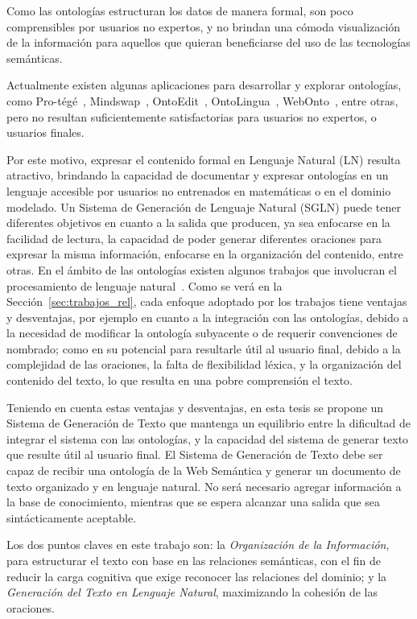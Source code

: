 \documentclass[11pt,a4paper,spanish]{book}
\begin{document}
Como las ontologías estructuran los datos de manera formal, son poco comprensibles por usuarios no expertos, y no brindan una cómoda visualización de la información para aquellos que quieran beneficiarse del uso de las tecnologías semánticas.

Actualmente existen algunas aplicaciones para  desarrollar y explorar ontologías, como Pro-tégé~\cite{protege}, Mindswap~\cite{golbeck2002new}, OntoEdit~\cite{sure2002ontoedit}, OntoLingua~\cite{farquhar1997ontolingua}, WebOnto~\cite{domingue1998tadzebao}, entre otras, pero no resultan suficientemente satisfactorias para usuarios no expertos, o usuarios finales. 

Por este motivo, expresar el contenido formal en Lenguaje Natural (LN) resulta atractivo, brindando la capacidad de documentar y expresar ontologías en un lenguaje accesible por usuarios no entrenados en matemáticas o en el dominio modelado. Un Sistema de Generación de Lenguaje Natural (SGLN) puede tener diferentes objetivos en cuanto a la salida que producen, ya sea enfocarse en la facilidad de lectura, la capacidad de poder generar diferentes oraciones para expresar la misma información,  enfocarse en la organización del contenido, entre otras. En el ámbito de las ontologías existen algunos trabajos que involucran el procesamiento de lenguaje natural~\cite{moreno2018ontologia}\cite{perez2002explotacion}\cite{vallez2009web}. Como se verá en la Sección~\ref{sec:trabajos_rel}, cada enfoque adoptado por los trabajos tiene ventajas y desventajas, por ejemplo en cuanto a la integración con las ontologías, debido a la necesidad de modificar la ontología subyacente o de requerir convenciones de nombrado; como en su potencial para resultarle útil al usuario final, debido a la complejidad de las oraciones, la falta de flexibilidad léxica, y la organización del contenido del texto, lo que resulta en una pobre comprensión el texto.  

Teniendo en cuenta estas ventajas y desventajas, en esta tesis se propone un Sistema de Generación de Texto que mantenga un equilibrio entre la dificultad de integrar el sistema con las ontologías, y la capacidad del sistema de generar texto que resulte útil al usuario final. El Sistema de Generación de Texto debe   ser capaz de recibir una ontología de la Web Semántica y generar un documento de texto organizado y en lenguaje natural. No será necesario agregar información a la base de conocimiento, mientras que se espera alcanzar una salida que sea sintácticamente aceptable.

Los dos puntos claves en este trabajo son: la \textit{Organización de la Información}, para estructurar el texto con base en las relaciones semánticas, con el fin de reducir la carga cognitiva que exige reconocer las relaciones del dominio; y la \textit{Generación del Texto en Lenguaje Natural}, maximizando la cohesión de las oraciones.
\end{document}
